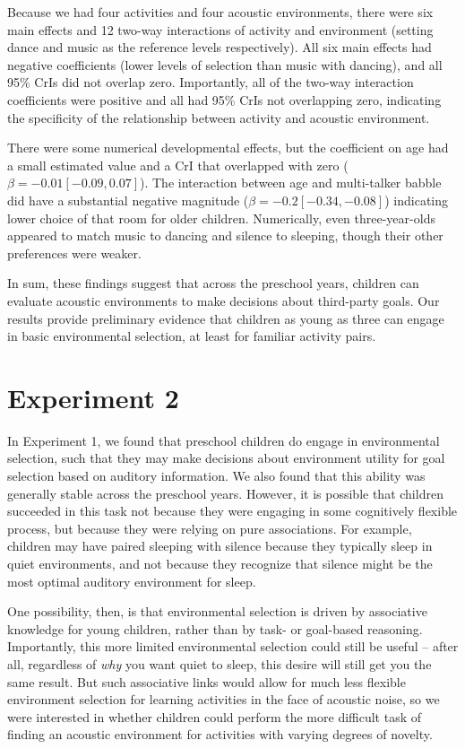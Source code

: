 \documentclass[10pt, letterpaper]{article}
\begin{document}
Because we had four activities and four acoustic environments, there
were six main effects and 12 two-way interactions of activity and
environment (setting dance and music as the reference levels
respectively). All six main effects had negative coefficients (lower
levels of selection than music with dancing), and all 95\% CrIs did not
overlap zero. Importantly, all of the two-way interaction coefficients
were positive and all had 95\% CrIs not overlapping zero, indicating the
specificity of the relationship between activity and acoustic
environment.

There were some numerical developmental effects, but the coefficient on
age had a small estimated value and a CrI that overlapped with zero
(\(\beta = -0.01 [-0.09, 0.07]\)). The interaction between age and
multi-talker babble did have a substantial negative magnitude
(\(\beta = -0.2 [-0.34,-0.08]\)) indicating lower choice of that room
for older children. Numerically, even three-year-olds appeared to match
music to dancing and silence to sleeping, though their other preferences
were weaker.

In sum, these findings suggest that across the preschool years, children
can evaluate acoustic environments to make decisions about third-party
goals. Our results provide preliminary evidence that children as young
as three can engage in basic environmental selection, at least for
familiar activity pairs.

\hypertarget{experiment-2}{%
\section{Experiment 2}\label{experiment-2}}

In Experiment 1, we found that preschool children do engage in
environmental selection, such that they may make decisions about
environment utility for goal selection based on auditory information. We
also found that this ability was generally stable across the preschool
years. However, it is possible that children succeeded in this task not
because they were engaging in some cognitively flexible process, but
because they were relying on pure associations. For example, children
may have paired sleeping with silence because they typically sleep in
quiet environments, and not because they recognize that silence might be
the most optimal auditory environment for sleep.

One possibility, then, is that environmental selection is driven by
associative knowledge for young children, rather than by task- or
goal-based reasoning. Importantly, this more limited environmental
selection could still be useful -- after all, regardless of \emph{why}
you want quiet to sleep, this desire will still get you the same result.
But such associative links would allow for much less flexible
environment selection for learning activities in the face of acoustic
noise, so we were interested in whether children could perform the more
difficult task of finding an acoustic environment for activities with
varying degrees of novelty.
\end{document}
